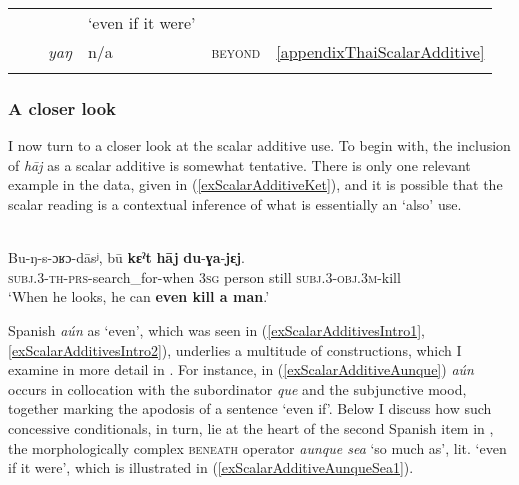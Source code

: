 {\begin{table}
\begin{tabular}{llllll}
		& & & \lq even if it were\rq{}\\
		& \ili{Thai} & \textit{yaŋ} & n/a & \textsc{beyond} & \ref{appendixThaiScalarAdditive}\\
		\lspbottomrule		
		\end{tabular}
\end{table}

\subsubsection{A closer look} I now turn to a closer look at the scalar additive use. To begin with, the inclusion of  \textit{hāj} as a scalar additive is somewhat tentative. There is only one relevant example in the data, given in (\ref{exScalarAdditiveKet}), and it is possible that the scalar reading is a contextual inference of what is essentially an \lq also\rq{ }use.

\begin{exe}
	\ex {}\label{exScalarAdditiveKet}\\
	\gll Bu-ŋ-s-ɔʁɔ-dāsʲ, bū \textbf{kɛˀt} \textbf{hāj} \textbf{du}-\textbf{ɣa}-\textbf{jɛj}.\\
	\textsc{subj}.3-\textsc{th}-\textsc{prs}-search\_for-when 3\textsc{sg} person still \textsc{subj}.3-\textsc{obj}.3\textsc{m}-kill\\
	\glt \lq When he looks, he can \textbf{even kill a man}.' \parencite[173]{Nefedov2015}
\end{exe}

Spanish \textit{aún} as \lq even\rq{}, which was seen in (\ref{exScalarAdditivesIntro1}, \ref{exScalarAdditivesIntro2}), underlies a multitude of  constructions, which I examine in more detail in . For instance, in (\ref{exScalarAdditiveAunque}) \textit{aún} occurs in collocation with the subordinator \textit{que} and the subjunctive mood, together marking the apodosis of a   sentence \lq even if\rq{}. Below I discuss how such concessive conditionals, in turn, lie at the heart of the second Spanish item in , the morphologically complex \textsc{beneath} operator \textit{aunque sea} \lq so much as\rq{}, lit. \lq{}even if it were\rq{}, which is illustrated in (\ref{exScalarAdditiveAunqueSea1}).

}

